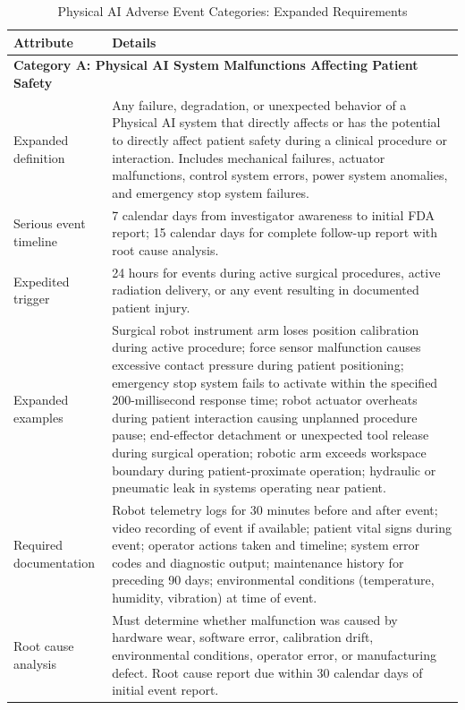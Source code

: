 \begin{table}[H]
\centering
\caption{Physical AI Adverse Event Categories: Expanded Requirements}
\label{tab:ae-categories-expanded}
\scriptsize
\begin{tabularx}{\textwidth}{l X}
\toprule
\textbf{Attribute} & \textbf{Details} \\
\midrule
\multicolumn{2}{l}{\textbf{Category A: Physical AI System Malfunctions Affecting Patient Safety}} \\
\midrule
Expanded definition & Any failure, degradation, or unexpected behavior of a Physical AI system that directly affects or has the potential to directly affect patient safety during a clinical procedure or interaction. Includes mechanical failures, actuator malfunctions, control system errors, power system anomalies, and emergency stop system failures. \\
\midrule
Serious event timeline & 7 calendar days from investigator awareness to initial FDA report; 15 calendar days for complete follow-up report with root cause analysis. \\
\midrule
Expedited trigger & 24 hours for events during active surgical procedures, active radiation delivery, or any event resulting in documented patient injury. \\
\midrule
Expanded examples & Surgical robot instrument arm loses position calibration during active procedure; force sensor malfunction causes excessive contact pressure during patient positioning; emergency stop system fails to activate within the specified 200-millisecond response time; robot actuator overheats during patient interaction causing unplanned procedure pause; end-effector detachment or unexpected tool release during surgical operation; robotic arm exceeds workspace boundary during patient-proximate operation; hydraulic or pneumatic leak in systems operating near patient. \\
\midrule
Required documentation & Robot telemetry logs for 30 minutes before and after event; video recording of event if available; patient vital signs during event; operator actions taken and timeline; system error codes and diagnostic output; maintenance history for preceding 90 days; environmental conditions (temperature, humidity, vibration) at time of event. \\
\midrule
Root cause analysis & Must determine whether malfunction was caused by hardware wear, software error, calibration drift, environmental conditions, operator error, or manufacturing defect. Root cause report due within 30 calendar days of initial event report. \\

\end{tabularx}
\end{table}
